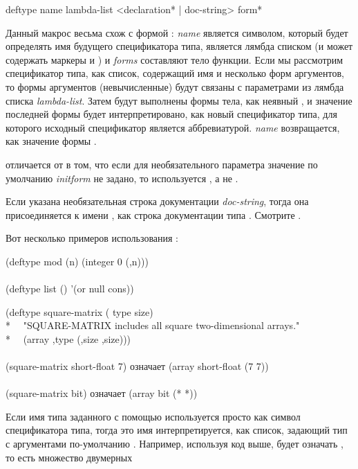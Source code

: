 \begin{defmac}
deftype name lambda-list <{declaration}* | doc-string> {form}*

Данный макрос весьма схож с формой : \emph{name} является
символом, который будет определять имя будущего спецификатора типа,
 является лямбда списком (и может содержать маркеры  и
) и \emph{forms} составляют тело функции. Если мы рассмотрим
спецификатор типа, как список, содержащий имя и несколько форм аргументов, то
формы аргументов (невычисленные) будут связаны с параметрами из лямбда списка
\emph{lambda-list}. Затем будут выполнены формы тела, как неявный ,
и значение последней формы будет интерпретировано, как новый спецификатор типа,
для которого исходный спецификатор является аббревиатурой. \emph{name}
возвращается, как значение формы .

 отличается от  в том, что если для необязательного 
параметра значение по умолчанию \emph{initform} не задано, то используется
\cd{*}, а не {\nil}.

Если указана необязательная строка документации \emph{doc-string}, тогда она
присоединяется к имени , как строка документации типа .
Смотрите .

Вот несколько примеров использования :
\begin{lisp}
(deftype mod (n) {\Xbq}(integer 0 (,n))) \\
 \\
(deftype list () '(or null cons))
\end{lisp}

\begin{lisp}
(deftype square-matrix ( type size) \\*
~~"SQUARE-MATRIX includes all square two-dimensional arrays." \\*
~~{\Xbq}(array ,type (,size ,size))) \\
 \\
(square-matrix short-float 7)  \textrm{означает}  (array short-float (7 7)) \\
 \\
(square-matrix bit)  \textrm{означает}  (array bit (* *))
\end{lisp}

Если имя типа заданного с помощью  используется просто как символ
спецификатора типа, тогда это имя интерпретируется, как список, задающий тип с
аргументами по-умолчанию \cd{*}. Например, используя код выше,
 будет означать , то есть множество двумерных


\end{defmac}
